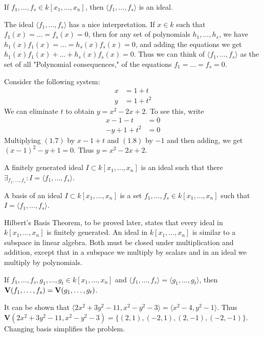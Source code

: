 \documentclass[../main.tex]{subfiles}
\begin{document}
\begin{theorem}
If $f_1,\hdots, f_s\in k[x_1,\hdots ,x_n]$, then $\langle f_1,\hdots, f_s\rangle$ is an ideal.
\end{theorem}
%
\begin{remark}
The ideal $\langle f_1,\hdots, f_s\rangle$ has a nice interpretation. If $x\in k$ such that $f_1(x) = \hdots = f_s(x) = 0$, then for any set of polynomials $h_1,\hdots, h_s$, we have $h_1(x)f_1(x) = \hdots = h_s(x)f_s(x) = 0$, and adding the equations we get $h_1(x)f_1(x)+\hdots + h_s(x)f_s(x) = 0$. Thus we can think of $\langle f_1,\hdots, f_s\rangle$ as the set of all "Polynomial consequences," of the equations $f_1 = \hdots = f_s = 0$.
\end{remark}
%
\begin{example}
Consider the following system:
\begin{align}
\nonumber x &= 1+t \\
\nonumber y &= 1+t^2
\end{align}
We can eliminate $t$ to obtain $y = x^2-2x+2$. To see this, write
\begin{align}
x - 1 - t &= 0 \\
-y+1+t^2 &=0
\end{align}
Multiplying $(1.7)$ by $x-1+t$ and $(1.8)$ by $-1$ and then adding, we get $(x-1)^2-y+1 = 0$. Thus $y = x^2-2x+2$.
\end{example}
%
\begin{definition}
A finitely generated ideal $I\subset k[x_1,\hdots ,x_n]$ is an ideal such that there $\exists_{f_1,\hdots, f_s}: I = \langle f_1,\hdots, f_s\rangle$.
\end{definition}
%
\begin{definition}
A basis of an ideal $I\subset k[x_1,\hdots ,x_n]$ is a set $f_1,\hdots, f_s\in k[x_1,\hdots ,x_n]$ such that $I = \langle f_1,\hdots, f_s\rangle$.
\end{definition}
%
Hilbert's Basis Theorem, to be proved later, states that every ideal in $k[x_1,\hdots ,x_n]$ is finitely generated. An ideal in $k[x_1,\hdots ,x_n]$ is similar to a subspace in linear algebra. Both must be closed under multiplication and addition, except that in a subspace we multiply by scalars and in an ideal we multiply by polynomials. 
%
\begin{theorem}
If $f_1,\hdots, f_s ,g_1,\hdots, g_t \in k[x_1,\hdots ,x_n]$ and $\langle f_1,\hdots, f_s\rangle = \langle g_1,\hdots, g_t\rangle$, then $\textbf{V}(f_1,\hdots, f_s) = \textbf{V}(g_1,\hdots, g_t)$.
\end{theorem}
%
\begin{example}
It can be shown that $\langle2x^2+3y^2-11,x^2-y^2-3\rangle = \langle x^2-4,y^2-1\rangle$. Thus $\mathbf{V}(2x^2+3y^2-11,x^2-y^2-3) = \{(2,1),(-2,1),(2,-1),(-2,-1)\}$. Changing basis simplifies the problem.
\end{example}
\end{document}
